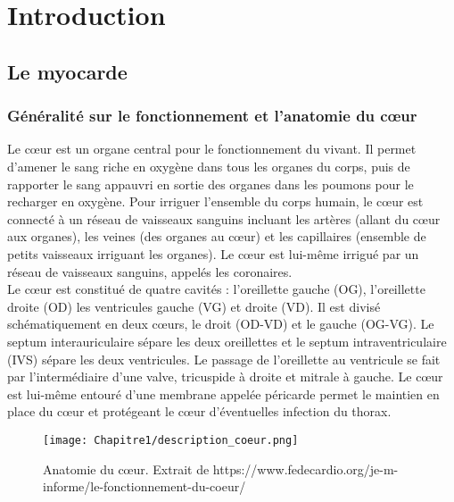 \chapter{Introduction}
\label{chap:intro}

\minitoc
\section{Le myocarde}


\subsection{Généralité sur le fonctionnement et l'anatomie du cœur }

Le cœur est un organe central pour le fonctionnement du vivant. Il permet d’amener le sang riche en oxygène dans tous les organes du corps, puis de rapporter le sang appauvri en sortie des organes dans les poumons pour le recharger en oxygène. Pour irriguer l’ensemble du corps humain, le cœur est connecté à un réseau de vaisseaux sanguins incluant les artères (allant du cœur aux organes), les veines (des organes au cœur) et les capillaires (ensemble de petits vaisseaux irriguant les organes). Le cœur est lui-même irrigué par un réseau de vaisseaux sanguins, appelés les coronaires. \\


Le cœur est constitué de quatre cavités : l’oreillette gauche (OG), l’oreillette droite (OD) les ventricules gauche (VG) et droite (VD). Il est divisé schématiquement en deux cœurs, le droit (OD-VD) et le gauche (OG-VG). Le septum interauriculaire sépare les deux oreillettes et le septum intraventriculaire (IVS) sépare les deux ventricules. Le passage de l’oreillette au ventricule se fait par l’intermédiaire d’une valve, tricuspide à droite et mitrale à gauche. Le cœur est lui-même entouré d’une membrane appelée péricarde permet le maintien en place du cœur et protégeant le cœur d’éventuelles infection du thorax.

\begin{figure}[!htbp]
  \begin{center}
    \texttt{[image: Chapitre1/description\_coeur.png]}
  \end{center}
  \caption{Anatomie du cœur. Extrait de https://www.fedecardio.org/je-m-informe/le-fonctionnement-du-coeur/}
  \label{fig:description_coeur}
\end{figure}

